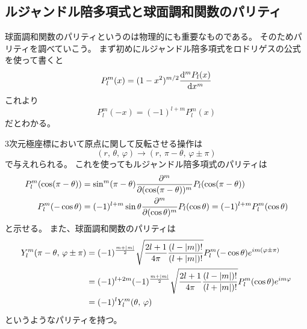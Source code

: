 \documentclass[../master.tex]{subfiles}
\begin{document}
\subsection{ルジャンドル陪多項式と球面調和関数のパリティ}
球面調和関数のパリティというのは物理的にも重要なものである。
そのためパリティを調べていこう。
まず初めにルジャンドル陪多項式をロドリゲスの公式を使って書くと
\begin{equation}
	P_l^{m}(x) = (1-x^2)^{m/2}\dv[m]{P_l(x)}{x}
\end{equation}
これより
\begin{equation}
	P_l^m(-x) = (-1)^{l+m}P_l^m(x)
\end{equation}
だとわかる。

3次元極座標において原点に関して反転させる操作は
\begin{equation}
	(r,\,\theta,\,\varphi)\rightarrow (r,\,\pi-\theta,\,\varphi\pm\pi)
\end{equation}
で与えれられる。
これを使ってもルジャンドル陪多項式のパリティは
\begin{equation}\begin{aligned}[b]
    P_l^m(\cos(\pi-\theta)) &= \sin^m(\pi-\theta)\pdv[m]{(\cos(\pi-\theta))}P_l(\cos(\pi-\theta))\\
	P_l^m(-\cos\theta) &= (-1)^{l+m} \sin\theta\pdv[m]{(\cos\theta)}P_l(\cos\theta) =(-1)^{l+m} P_l^m(\cos\theta)
\end{aligned}\end{equation}
と示せる。
また、球面調和関数のパリティは
\begin{equation}\begin{aligned}[b]
	Y_l^m(\pi-\theta,\,\varphi\pm\pi)
	&=(-1)^{\frac{m+\abs{m}}{2}}\sqrt{\frac{2l+1}{4\pi}\frac{(l-\abs{m})!}{(l+\abs{m})!}}P_l^m(-\cos\theta)e^{im(\varphi\pm\pi)}\\
	&=(-1)^{l+2m}(-1)^{\frac{m+\abs{m}}{2}}\sqrt{\frac{2l+1}{4\pi}\frac{(l-\abs{m})!}{(l+\abs{m})!}}P_l^m(\cos\theta)e^{im\varphi}\\
	&=(-1)^lY_l^m(\theta,\,\varphi)
\end{aligned}\end{equation}
というようなパリティを持つ。
\end{document}
